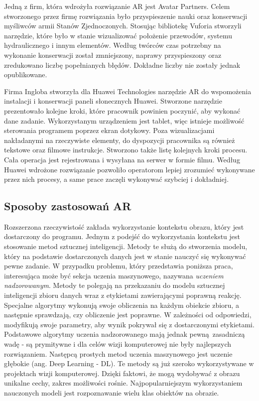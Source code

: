 \documentclass[12pt,twoside,polish]{article}
\begin{document}
Jedną z firm, która wdrożyła rozwiązanie AR jest Avatar Partners. Celem stworzonego przez firmę rozwiązania było przyspieszenie nauki oraz konserwacji myśliwców armii Stanów Zjednoczonych. Stosując bibliotekę Vuforia stworzyli narzędzie, które było w stanie wizualizować położenie przewodów, systemu hydraulicznego i innym elementów. Według twórców czas potrzebny na wykonanie konserwacji został zmniejszony, naprawy przyspieszony oraz zredukowano liczbę popełnianych błędów. Dokładne liczby nie zostały jednak opublikowane. \cite{avatarpartnerscasestudy}


Firma Ingloba stworzyła dla Huawei Technologies narzędzie AR do wspomożenia instalacji i konserwacji paneli słonecznych Huawei. Stworzone narzędzie prezentowało kolejne kroki, które pracownik powinien poczynić, aby wykonać dane zadanie. Wykorzystanym urządzeniem jest tablet, więc istnieje możliwość sterowania programem poprzez ekran dotykowy. Poza wizualizacjami nakładanymi na rzeczywiste elementy, do dyspozycji pracownika są również tekstowe oraz filmowe instrukcje. Stworzono także listę kolejnych kroki procesu. Cała operacja jest rejestrowana i wysyłana na serwer w formie filmu. Według Huawei wdrożone rozwiązanie pozwoliło  operatorom lepiej zrozumieć wykonywane przez nich procesy, a same prace zaczęli wykonywać szybciej i dokładniej. \cite{huaweicasestudy}


\subsection {Sposoby zastosowań AR}
Rozszerzona rzeczywistość zakłada wykorzystanie kontekstu obrazu, który jest dostarczony do programu. Jednym z podejść do wykorzystania kontekstu jest stosowanie metod sztucznej inteligencji. Metody te służą do stworzenia modelu, który na podstawie dostarczonych danych jest w stanie nauczyć się wykonywać pewne zadanie. W przypadku problemu, który przedstawia poniższa praca, interesująca może być sekcja uczenia maszynowego, nazywana \emph{uczeniem nadzorowanym}. Metody te polegają na przekazaniu do modelu sztucznej inteligencji zbioru danych wraz z etykietami zawierającymi poprawną reakcję. Specjalne algorytmy wykonują swoje obliczenia na każdym obiekcie zbioru, a następnie sprawdzają, czy obliczenie jest poprawne. W zależności od odpowiedzi, modyfikują swoje parametry, aby wynik pokrywał się z dostarczonymi etykietami. Podstawowe algorytmy uczenia nadzorowanego mają jednak pewną zasadniczą wadę - są prymitywne i dla celów wizji komputerowej nie były najlepszych rozwiązaniem. Następcą prostych metod uczenia maszynowego jest uczenie głębokie (ang. Deep Learning - DL). Te metody są już szeroko wykorzystywane w projektach wizji komputerowej. Dzięki faktowi, że mogą wydobywać z obrazu unikalne cechy, zakres możliwości rośnie. Najpopularniejszym wykorzystaniem nauczonych modeli jest rozpoznawanie wielu klas obiektów na obrazie.
\end{document}
